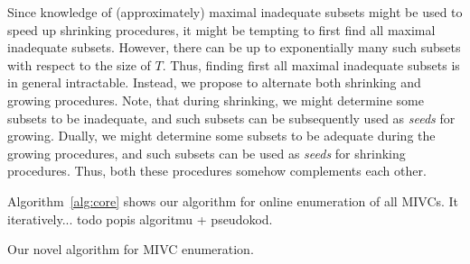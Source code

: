 Since knowledge of (approximately) maximal inadequate subsets might be used to speed up shrinking procedures, it might be tempting to first find all maximal inadequate subsets. However, there can be up to exponentially many such subsets with respect to the size of $T$. Thus, finding first all maximal inadequate subsets is in general intractable. Instead, we propose to alternate both shrinking and growing procedures. Note, that during shrinking, we might determine some subsets to be inadequate, and such subsets can be subsequently used as \emph{seeds} for growing. Dually, we might determine some subsets to be adequate during the growing procedures, and such subsets can be used as \emph{seeds} for shrinking procedures. Thus, both these procedures somehow complements each other. 

Algorithm~\ref{alg:core} shows our algorithm for online enumeration of all MIVCs. It iteratively... todo popis algoritmu + pseudokod. 


\begin{algorithm}[!t]

\caption{Our novel algorithm for MIVC enumeration.}
\end{algorithm}




 